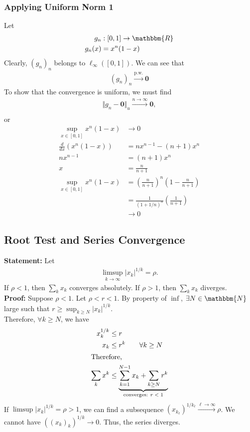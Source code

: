 \documentclass[10pt]{extarticle}
\renewcommand{\mathbf}[1]{\mathbold{#1}}
\newcommand{\N}{\mathbbm{N}}
\newcommand{\R}{\mathbbm{R}}
\begin{document}
    \subsubsection{Applying Uniform Norm 1}%
    Let
    \begin{align*}
      g_n&: [0,1] \rightarrow \R\\
      g_n(x) &= x^n(1-x)
    \end{align*}
    Clearly, $(g_n)_n$ belongs to $\ell_{\infty}([0,1])$. We can see that
    \begin{align*}
      (g_n)_n \xrightarrow{\text{p.w.}} \mathbf{0}
    \end{align*}
    To show that the convergence is uniform, we must find 
    \begin{align*}
      \Vert g_n - \mathbf{0}\Vert_u \xrightarrow{n\rightarrow\infty} \mathbf{0},\\
    \end{align*}
    or
    \begin{align*}
      \sup_{x\in[0,1]}x^n(1-x)&\rightarrow 0\\
      \frac{d}{dx}(x^n(1-x)) &= nx^{n-1} - (n+1)x^n\\
      nx^{n-1} &= (n+1)x^n\\
      x &= \frac{n}{n+1}\\
      \sup_{x\in[0,1]}x^n(1-x) &= \left(\frac{n}{n+1}\right)^n\left(1-\frac{n}{n+1}\right)\\
                               &= \frac{1}{(1+1/n)^n}\left(\frac{1}{n+1}\right)\\
                               &\rightarrow 0
    \end{align*}
  \subsection{Root Test and Series Convergence}%
    \textbf{Statement:} Let
    \begin{align*}
      \limsup_{k\rightarrow\infty}|x_k|^{1/k} = \rho.
    \end{align*}
    If $\rho < 1$, then $\sum_k x_k$ converges absolutely. If $\rho > 1$, then $\sum_k x_k$ diverges.\\

    \textbf{Proof:} Suppose $\rho < 1$. Let $\rho < r < 1$. By property of $\inf$, $\exists N\in \N$ large such that $r \geq \sup_{k\geq N}|x_k|^{1/k}$.\\

    Therefore, $\forall k\geq N$, we have
    \begin{align*}
      x_k^{1/k} &\leq r\\
      x_k &\leq r^k \tag*{$\forall k \geq N$}\\
      \shortintertext{Therefore,}
      \sum_k x^k &\leq \underbrace{\sum_{k=1}^{N-1} x_k + \sum_{k\geq N}r^k}_{\text{converges: $r < 1$}}
    \end{align*}
    If $\limsup |x_k|^{1/k} = \rho > 1$, we can find a subsequence $\left(x_{k_\ell}\right)^{1/{k_\ell}} \xrightarrow{\ell\rightarrow\infty} \rho$. We cannot have $\left((x_k)_k\right)^{1/k} \rightarrow 0$. Thus, the series diverges.
\end{document}
